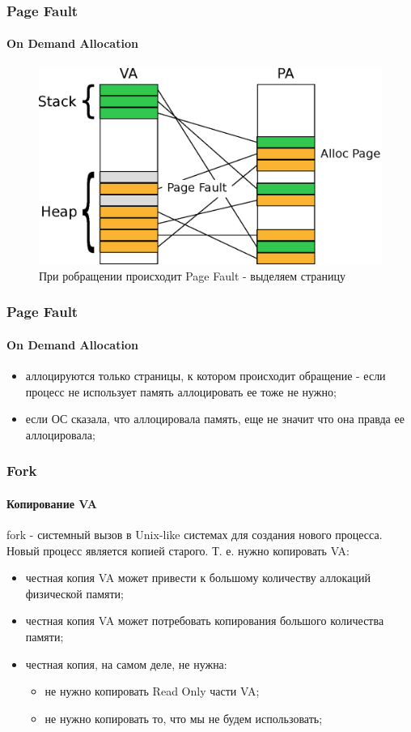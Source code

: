 \begin{frame}
\frametitle{Page Fault}
\framesubtitle{On Demand Allocation}

\begin{figure}
  \centering\includegraphics[width=.9\linewidth]{page-demand2}
  \caption{При робращении происходит Page Fault - выделяем страницу}
\end{figure}
\end{frame}

\begin{frame}
\frametitle{Page Fault}
\framesubtitle{On Demand Allocation}

\begin{itemize}
  \item<1-> аллоцируются только страницы, к котором происходит обращение - если процесс не использует память аллоцировать ее тоже не нужно;
  \item<2-> если ОС сказала, что аллоцировала память, еще не значит что она правда ее аллоцировала; 
\end{itemize}
\end{frame}

\begin{frame}
\frametitle{Fork}
\framesubtitle{Копирование VA}

fork - системный вызов в Unix-like системах для создания нового процесса. Новый
процесс является копией старого. Т. е. нужно копировать VA:

\begin{itemize}
  \item честная копия VA может привести к большому количеству аллокаций физической памяти;
  \item честная копия VA может потребовать копирования большого количества памяти;
  \item<2-> честная копия, на самом деле, не нужна:
    \begin{itemize}
       \item не нужно копировать Read Only части VA;
       \item не нужно копировать то, что мы не будем использовать;
    \end{itemize}
\end{itemize}
\end{frame}

